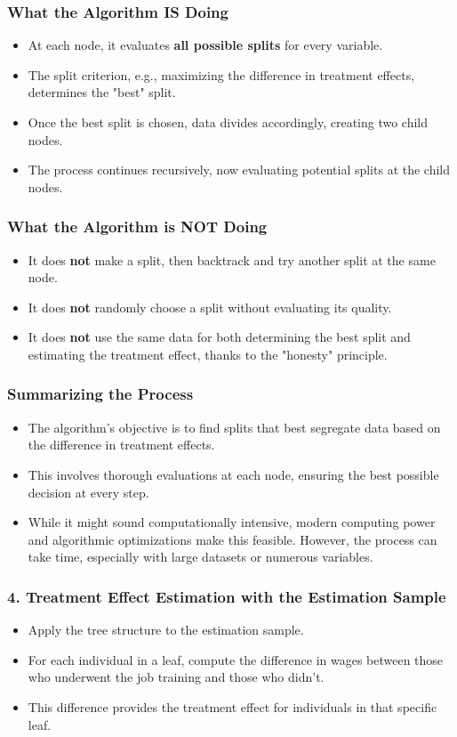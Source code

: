 \documentclass{beamer}
\begin{document}
\begin{frame}
\frametitle{What the Algorithm IS Doing}
\begin{itemize}
    \item At each node, it evaluates \textbf{all possible splits} for every variable.
    \item The split criterion, e.g., maximizing the difference in treatment effects, determines the "best" split.
    \item Once the best split is chosen, data divides accordingly, creating two child nodes.
    \item The process continues recursively, now evaluating potential splits at the child nodes.
\end{itemize}
\end{frame}

\begin{frame}
\frametitle{What the Algorithm is NOT Doing}
\begin{itemize}
    \item It does \textbf{not} make a split, then backtrack and try another split at the same node.
    \item It does \textbf{not} randomly choose a split without evaluating its quality.
    \item It does \textbf{not} use the same data for both determining the best split and estimating the treatment effect, thanks to the "honesty" principle.
\end{itemize}
\end{frame}

\begin{frame}
\frametitle{Summarizing the Process}
\begin{itemize}
    \item The algorithm's objective is to find splits that best segregate data based on the difference in treatment effects.
    \item This involves thorough evaluations at each node, ensuring the best possible decision at every step.
    \item While it might sound computationally intensive, modern computing power and algorithmic optimizations make this feasible. However, the process can take time, especially with large datasets or numerous variables.
\end{itemize}
\end{frame}


\begin{frame}
\frametitle{4. Treatment Effect Estimation with the Estimation Sample}
\begin{itemize}
    \item Apply the tree structure to the estimation sample.
    \item For each individual in a leaf, compute the difference in wages between those who underwent the job training and those who didn't.
    \item This difference provides the treatment effect for individuals in that specific leaf.
\end{itemize}
\end{frame}
\end{document}
